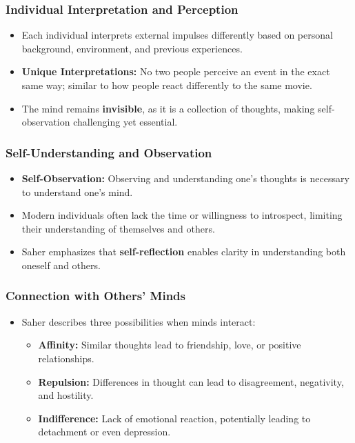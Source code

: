 \begin{frame}[fragile]\frametitle{Individual Interpretation and Perception}
\begin{itemize}
    \item Each individual interprets external impulses differently based on personal background, environment, and previous experiences.
    \item \textbf{Unique Interpretations:} No two people perceive an event in the exact same way; similar to how people react differently to the same movie.
    \item The mind remains \textbf{invisible}, as it is a collection of thoughts, making self-observation challenging yet essential.
\end{itemize}
\end{frame}

\begin{frame}[fragile]\frametitle{Self-Understanding and Observation}
\begin{itemize}
    \item \textbf{Self-Observation:} Observing and understanding one’s thoughts is necessary to understand one's mind.
    \item Modern individuals often lack the time or willingness to introspect, limiting their understanding of themselves and others.
    \item Saher emphasizes that \textbf{self-reflection} enables clarity in understanding both oneself and others.
\end{itemize}
\end{frame}

\begin{frame}[fragile]\frametitle{Connection with Others’ Minds}
\begin{itemize}
    \item Saher describes three possibilities when minds interact:
    \begin{itemize}
        \item \textbf{Affinity:} Similar thoughts lead to friendship, love, or positive relationships.
        \item \textbf{Repulsion:} Differences in thought can lead to disagreement, negativity, and hostility.
        \item \textbf{Indifference:} Lack of emotional reaction, potentially leading to detachment or even depression.
    \end{itemize}
\end{itemize}
\end{frame}

